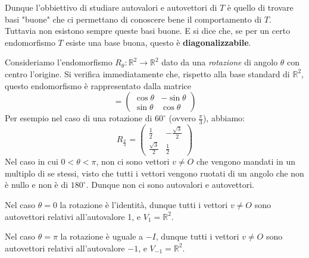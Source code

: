 Dunque l'obbiettivo di studiare autovalori e autovettori di $T$ \`e quello di
trovare basi "buone" che ci permettano di conoscere bene il comportamento di $T$.
Tuttavia non esistono sempre queste basi buone. E si dice che, se per un certo
endomorfismo $T$ esiste una base buona, questo \`e \textbf{diagonalizzabile}.

\begin{example}
	Consideriamo l'endomorfismo $R_{\theta} : \mathbb{R}^2 \to \mathbb{R}^2$ dato
	da una \emph{rotazione} di angolo $\theta$ con centro l'origine. Si verifica
	immediatamente che, rispetto alla base standard di $\mathbb{R}^2$, questo
	endomorfismo \`e rappresentato dalla matrice
	\begin{equation*}
		[R_\theta] = \begin{pmatrix}
			\cos{\theta} & -\sin{\theta} \\
			\sin{\theta} & \cos{\theta}
		\end{pmatrix}
	\end{equation*}
	Per esempio nel caso di una rotazione di $60^\circ$ (ovvero $\frac{\pi}{3}$),
	abbiamo:
	\begin{equation*}
		R_{\frac{\pi}{3}} = \begin{pmatrix}
			\frac{1}{2}        & -\frac{\sqrt{3}}{2} \\
			\frac{\sqrt{3}}{2} & \frac{1}{2}
		\end{pmatrix}
	\end{equation*}
	Nel caso in cui $0 < \theta < \pi$, non ci sono vettori $v \neq O$ che vengono
	mandati in un multiplo di se stessi, visto che tutti i vettori vengono ruotati
	di un angolo che non \`e nullo e non \`e di $180^\circ$. Dunque non ci sono
	autovalori e autovettori.
	
	Nel caso $\theta = 0$ la rotazione \`e l'identit\`a, dunque tutti i vettori
	$v \neq O$ sono autovettori relativi all'autovalore 1, e $V_1 = \mathbb{R}^2$.
	
	Nel caso $\theta = \pi$ la rotazione \`e uguale a $-I$, dunque tutti i vettori
	$v \neq O$ sono autovettori relativi all'autovalore $-1$, e
	$V_{-1} = \mathbb{R}^2$.
\end{example}